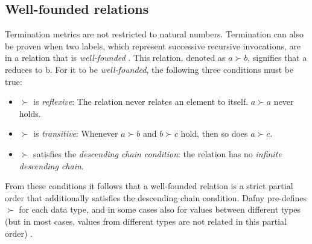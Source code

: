 \documentclass[a4paper]{article}
\begin{document}
\subsection{Well-founded relations}
Termination metrics are not restricted to natural numbers.
Termination can also be proven when two labels, which represent successive recursive invocations, are in a relation
that is \textit{well-founded} \cite{leino2023program}. This relation, denoted as $a \succ b$, signifies that a
reduces to b. For it to be \textit{well-founded}, the following three conditions must be true:
\begin{itemize}
	\item $ \succ $ is \textit{reflexive}: The relation never relates an element to itself. $a \succ a$ never holds.
	\item $ \succ $ is \textit{transitive}: Whenever $a \succ b$ and $b \succ c$ hold, then so does $a \succ c$.
	\item $ \succ $ satisfies the \textit{descending chain condition}: the relation has no \textit{infinite descending chain}.
\end{itemize}
From these conditions it follows that a well-founded relation is a strict partial order that additionally
satisfies the descending chain condition. Dafny pre-defines $ \succ $ for each data type, and in some cases also
for values between different types (but in most cases, values from different types are not related in
this partial order) \cite{leino2023program}.
\end{document}
